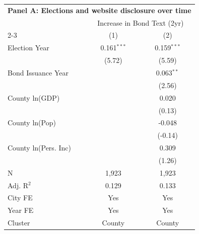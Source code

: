 \begingroup
\centering
\begin{tabular*}{\textwidth}{@{\extracolsep{\fill}}lcc}
\multicolumn{3}{l}{\textbf{Panel A: Elections and website disclosure over time}}\\

\addlinespace
   \toprule
    & \multicolumn{2}{c}{Increase in Bond Text (2yr)}\\
   \cmidrule(lr){2-3}
                        & (1)           & (2)\\  
   \midrule 
   Election Year        & 0.161$^{***}$ & 0.159$^{***}$\\   
                        & (5.72)       & (5.59)\\   
   Bond Issuance Year   &               & 0.063$^{**}$\\   
                        &               & (2.56)\\   
   County ln(GDP)       &               & 0.020\\   
                        &               & (0.13)\\   
   County ln(Pop)       &               & -0.048\\   
                        &               & (-0.14)\\   
   County ln(Pers. Inc) &               & 0.309\\   
                        &               & (1.26)\\   
   \hline
   N         & 1,923         & 1,923\\  
   Adj. R$^2$       & 0.129         & 0.133\\  
   City FE              & Yes           & Yes\\  
   Year FE              & Yes           & Yes\\  
   Cluster              & County & County\\  
   \bottomrule
\end{tabular*}
\par\endgroup
